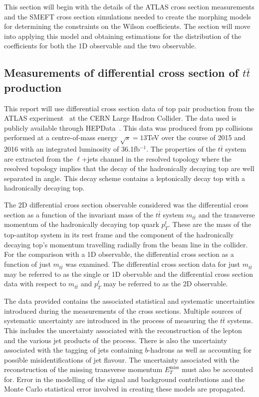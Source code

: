 \documentclass[a4paper,11pt]{article}
\begin{document}
This section will begin with the details of the ATLAS cross section measurements and the SMEFT cross section simulations needed to create the morphing models for determining the constraints on the Wilson coefficients.
The section will move into applying this model and obtaining estimations for the distribution of the coefficients for both the 1D observable and the two observable.

\subsection{Measurements of differential cross section of \texorpdfstring{$t\bar{t}$}{ttbar} production}
This report will use differential cross section data of top pair production from the ATLAS experiment~\cite{ATLAS:2019hxz} at the CERN Large Hadron Collider.
The data used is publicly available through HEPData~\cite{hepdata1750330}.
This data was produced from pp collisions performed at a centre-of-mass energy $\sqrt{s} = 13$TeV over the course of 2015 and 2016 with an integrated luminosity of 36.1fb$^{-1}$.
The properties of the $t\bar{t}$ system are extracted from the $\ell$+jets channel in the resolved topology where the resolved topology implies that the decay of the hadronically decaying top are well separated in angle.
This decay scheme contains a leptonically decay top with a hadronically decaying top.

The 2D differential cross section observable considered was the differential cross section as a function of the invariant mass of the $t\bar{t}$ system $m_{t\bar{t}}$ and the transverse momentum of the hadronically decaying top quark $p_{T}^{t}$.
These are the mass of the top-antitop system in its rest frame and the component of the hadronically decaying top's momentum travelling radially from the beam line in the collider.
For the comparison with a 1D observable, the differential cross section as a function of just $m_{t\bar{t}}$ was examined.
The differential cross section data for just $m_{t\bar{t}}$ may be referred to as the single or 1D obervable and the differential cross section data with respect to $m_{t\bar{t}}$ and $p_{T}^{t}$ may be referred to as the 2D observable.

The data provided contains the associated statistical and systematic uncertainties introduced during the measurements of the cross sections.
Multiple sources of systematic uncertainty are introduced in the process of measuring the $t\bar{t}$ systems.
This includes the uncertainty associated with the reconstruction of the lepton and the various jet products of the process.
There is also the uncertainty associated with the tagging of jets containing $b$-hadrons as well as accounting for possible misidentifications of jet flavour.
The uncertainty associated with the reconstruction of the missing transverse momentum $E_{T}^{\text{miss}}$ must also be accounted for.
Error in the modelling of the signal and background contributions and the Monte Carlo statistical error involved in creating these models are propagated.
\end{document}
